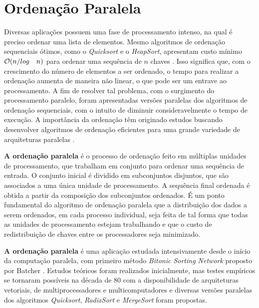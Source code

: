 \section{Ordenação Paralela}


Diversas aplicações possuem uma fase de processamento intenso, na qual é preciso ordenar uma lista de elementos. Mesmo algoritmos de ordenação sequenciais ótimos, como o \textit{Quicksort} e o \textit{HeapSort}, apresentam custo mínimo ${\cal O}(n/log \quad n)$ para ordenar uma sequência de $n$ chaves \cite{Cormen:2009}. 
Isso significa que, com o crescimento do número de elementos a ser ordenado, o tempo para realizar a ordenação aumenta de maneira não linear, o que pode ser um entrave ao processamento. 
A fim de resolver tal problema, com o surgimento do processamento paralelo, foram apresentadas versões paralelas dos algoritmos de ordenação sequenciais, com o intuito de diminuir consideravelmente o tempo de execução. A importância da ordenação têm originado estudos buscando desenvolver algoritmos de ordenação eficientes para uma grande variedade de arquiteturas paralelas \cite{Akl:1990}.

\textbf{A ordenação paralela} é o processo  de ordenação feito em múltiplas unidades de processamento, que trabalham em conjunto para ordenar uma sequência de entrada. O conjunto inicial é dividido em subconjuntos disjuntos, que são associados a uma única unidade de processamento. A sequência final ordenada é obtida a partir da composição dos subconjuntos ordenados. É um ponto fundamental do algoritmo de ordenação paralela que a distribuição dos dados a serem ordenados, em cada processo individual, seja feita de tal forma que todas as unidades de processamento estejam trabalhando e que o custo de redistribuição de chaves entre os processadores seja minimizado. 

\textbf{A ordenação paralela} é uma aplicação estudada intensivamente desde o início da computação paralela, com primeiro método \textit{Bitonic Sorting Network} proposto por Batcher \cite{Batcher:1968}. 
Estudos teóricos foram realizados inicialmente, mas testes empíricos se tornaram possíveis na década de 80 com a disponibilidade de arquiteturas vetoriais, de multiprocessadores e multicomputadores e diversas versões paralelas dos algoritmos \textit{Quicksort}, \textit{RadixSort} e \textit{MergeSort} foram propostas.



